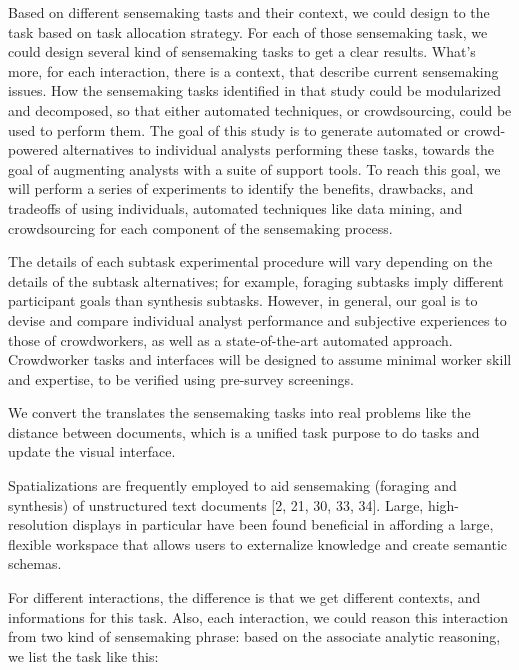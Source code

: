 \documentclass[journal]{vgtc}                %
\begin{document}
Based on different sensemaking tasts and their context, we could design to the task based on task allocation strategy.
For each of those sensemaking task, we could design several kind of sensemaking tasks to get a clear results.
What's more, for each interaction, there is a context, that describe current sensemaking issues.
How the sensemaking tasks identified in that study could be modularized and decomposed, so that either automated techniques, or crowdsourcing, could be used to perform them. The goal of this study is to generate automated or crowd-powered alternatives to individual analysts performing these tasks, towards the goal of augmenting analysts with a suite of support tools. To reach this goal, we will perform a series of experiments to identify the benefits, drawbacks, and tradeoffs of using individuals, automated techniques like data mining, and crowdsourcing for each component of the sensemaking process.

The details of each subtask experimental procedure will vary depending on the details of the subtask alternatives; for example, foraging subtasks imply different participant goals than synthesis subtasks. However, in general, our goal is to devise and compare individual analyst performance and subjective experiences to those of crowdworkers, as well as a state-of-the-art automated approach. Crowdworker tasks and interfaces will be designed to assume minimal worker skill and expertise, to be verified using pre-survey screenings.

We convert the translates the sensemaking tasks into real problems like the distance between documents, which is a unified task purpose to do tasks and update the visual interface.

Spatializations are frequently employed to aid sensemaking (foraging and synthesis) of unstructured text documents [2, 21, 30, 33, 34].
Large, high-resolution displays in particular have been found beneficial in affording a large, flexible workspace that allows users to externalize knowledge and create semantic schemas.

For different interactions, the difference is that we get different contexts, and informations for this task.
Also, each interaction, we could reason this interaction from two kind of sensemaking phrase: based on the associate analytic reasoning, we list the task like this:
\end{document}
